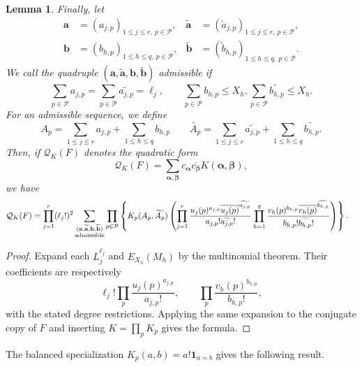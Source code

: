 \documentclass[oneside, 12pt]{amsart}
\newtheorem{lem}[thm]{Lemma}
\theoremstyle{definition}
\begin{document}
\begin{lem}
		Finally, let
		\[
		\begin{aligned}
			\mathbf a&=(a_{j,p})_{1\leq j\leq r,\ p\in\mathcal P},
			&\widetilde{\mathbf a}&=(\widetilde a_{j,p})_{1\leq j\leq r,\ p\in\mathcal P},\\
			\mathbf b&=(b_{h,p})_{1\leq h\leq q,\ p\in\mathcal P},
			&\widetilde{\mathbf b}&=(\widetilde b_{h,p})_{1\leq h\leq q,\ p\in\mathcal P}.
		\end{aligned}
		\]
		We call the quadruple
		$(\mathbf a,\widetilde{\mathbf a},\mathbf b,\widetilde{\mathbf b})$
		admissible if $$\sum_{p \in \mathcal{P}} a_{j,p}=\sum_{p \in \mathcal{P}} \widetilde{a_{j,p}} = \ell_j, \qquad \sum_{p \in \mathcal{P}} b_{h,p} \leq X_h, \sum_{p \in \mathcal{P}} \widetilde{b_{h,p}}\leq X_h.$$ For an admissible sequence, we define $$A_p = \sum_{1\leq j \leq r} a_{j,p}+\sum_{1\leq h \leq q} b_{h,p} \qquad \widetilde{A_p} = \sum_{1 \leq j \leq r} \widetilde{a_{j,p}} + \sum_{1 \leq h \leq q} \widetilde{b_{h,p}}.$$ Then, if $\mathcal{Q}_K(F)$ denotes the quadratic form $$\mathcal{Q}_K(F)=\sum_{\boldsymbol{\alpha},\boldsymbol{\beta}} c_{\boldsymbol{\alpha}}\overline{c_{\boldsymbol{\beta}}}K(\boldsymbol{\alpha},\boldsymbol{\beta}),$$ we have
		\begin{align*}
			\mathcal{Q}_K(F)&={\prod_{j=1}^r (\ell_j!)^2 \sum_{\substack{(\mathbf{a},\widetilde{\mathbf{a}},\mathbf{b},\widetilde{\mathbf{b}})\\ \textup{admissible}}} \prod_{p \in \mathcal{P}} \left\{K_p(A_p,\widetilde{A_p})  \left(\prod_{j=1}^r \frac{u_j(p)^{a_{j,p}}\overline{u_j(p)}^{\widetilde{a_{j,p}}}}{a_{j,p}!\widetilde{a_{j,p}}!}  \prod_{h=1}^q \frac{v_h(p)^{b_{h,p}}\overline{v_h(p)}^{\widetilde{b_{h,p}}}}{b_{h,p}!\widetilde{b_{h,p}}!}\right)\right\}.}
		\end{align*}
	\end{lem}
	
	
	\begin{proof}
		Expand each $L_j^{\ell_j}$ and $E_{X_h}(M_h)$ by the multinomial
		theorem.  Their coefficients are respectively
		\[
		\ell_j!\prod_p\frac{u_j(p)^{a_{j,p}}}{a_{j,p}!},
		\qquad
		\prod_p\frac{v_h(p)^{b_{h,p}}}{b_{h,p}!},
		\]
		with the stated degree restrictions.
		Applying the same expansion to the conjugate copy of $F$ and inserting
		$K=\prod_pK_p$ gives the formula.
	\end{proof}
	
	{The balanced specialization $K_p(a,b)=a!\mathbf{1}_{a=b}$ gives the following result.}
	
\end{document}
